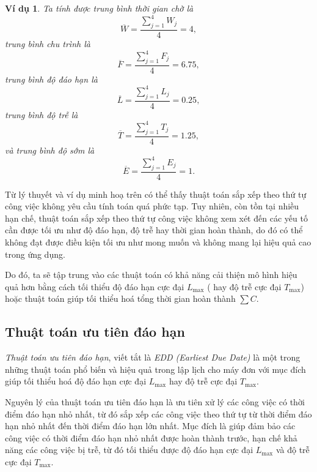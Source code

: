 \documentclass[12pt,a4paper]{report}
\newtheorem{vd}{Ví dụ}
\begin{document}
\begin{vd}
Ta tính được trung bình thời gian chờ là
\begin{equation*}
\overline{W} = \frac{\sum_{j=1}^4 W_j}{4} = 4,
\end{equation*}
trung bình chu trình là
\begin{equation*}
\overline{F} = \frac{\sum_{j=1}^4 F_j}{4} = 6.75,
\end{equation*}
trung bình độ đáo hạn là
\begin{equation*}
\overline{L} = \frac{\sum_{j=1}^4 L_j}{4} = 0.25,
\end{equation*}
trung bình độ trễ là
\begin{equation*}
\overline{T} = \frac{\sum_{j=1}^4 T_j}{4} = 1.25,
\end{equation*}
và trung bình độ sớm là
\begin{equation*}
\overline{E} = \frac{\sum_{j=1}^4 E_j}{4} = 1.
\end{equation*}
\end{vd}

Từ lý thuyết và ví dụ minh hoạ trên có thể thấy thuật toán sắp xếp theo thứ tự công việc không yêu cầu tính toán quá phức tạp. Tuy nhiên, còn tồn tại nhiều hạn chế, thuật toán sắp xếp theo thứ tự công việc không xem xét đến các yếu tố cần được tối ưu như độ đáo hạn, độ trễ hay thời gian hoàn thành, do đó có thể không đạt được điều kiện tối ưu như mong muốn và không mang lại hiệu quả cao trong ứng dụng.

Do đó, ta sẽ tập trung vào các thuật toán có khả năng cải thiện mô hình hiệu quả hơn bằng cách tối thiểu độ đáo hạn cực đại $L_{\max}$ ( hay độ trễ cực đại $T_{\max}$) hoặc thuật toán giúp tối thiểu hoá tổng thời gian hoàn thành $\sum C$.
\subsection{Thuật toán ưu tiên đáo hạn}
\textit{Thuật toán ưu tiên đáo hạn}, viết tắt là \textit{EDD (Earliest Due Date)} là một trong những thuật toán phổ biến và hiệu quả trong lập lịch cho máy đơn với mục đích giúp tối thiểu hoá độ đáo hạn cực đại $L_{\max}$ hay độ trễ cực đại $T_{\max}$.

Nguyên lý của thuật toán ưu tiên đáo hạn là ưu tiên xử lý các công việc có thời điểm đáo hạn nhỏ nhất, từ đó sắp xếp các công việc theo thứ tự từ thời điểm đáo hạn nhỏ nhất đến thời điểm đáo hạn lớn nhất. Mục đích là giúp đảm bảo các công việc có thời điểm đáo hạn nhỏ nhất được hoàn thành trước, hạn chế khả năng các công việc bị trễ, từ đó tối thiểu được độ đáo hạn cực đại $L_{\max}$ và độ trễ cực đại $T_{\max}$.
\end{document}

